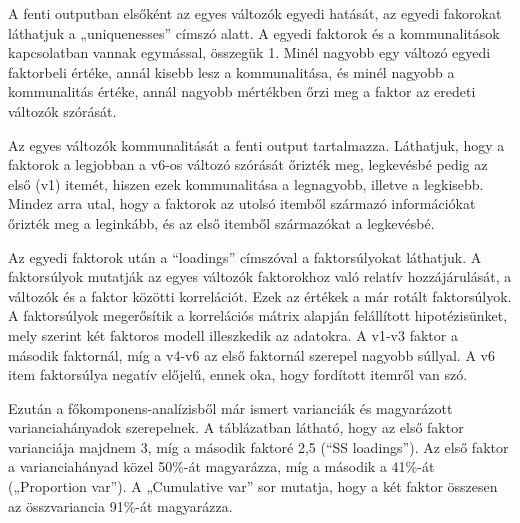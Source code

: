 \documentclass[
  letterpaper,
]{krantz}
\makeatletter
\newenvironment{Shaded}{\begin{snugshade}}{\end{snugshade}}
\newcommand{\AttributeTok}[1]{\textcolor[rgb]{0.40,0.45,0.13}{#1}}
\newcommand{\CommentTok}[1]{\textcolor[rgb]{0.37,0.37,0.37}{#1}}
\newcommand{\DecValTok}[1]{\textcolor[rgb]{0.68,0.00,0.00}{#1}}
\newcommand{\FunctionTok}[1]{\textcolor[rgb]{0.28,0.35,0.67}{#1}}
\newcommand{\NormalTok}[1]{\textcolor[rgb]{0.00,0.23,0.31}{#1}}
\newcommand{\OtherTok}[1]{\textcolor[rgb]{0.00,0.23,0.31}{#1}}
\newcommand{\SpecialCharTok}[1]{\textcolor[rgb]{0.37,0.37,0.37}{#1}}
\newenvironment{kframe}{%
\medskip{}
\setlength{\fboxsep}{.8em}
 \def\at@end@of@kframe{}%
 \ifinner\ifhmode%
  \def\at@end@of@kframe{\end{minipage}}%
  \begin{minipage}{\columnwidth}%
 \fi\fi%
 \def\FrameCommand##1{\hskip\@totalleftmargin \hskip-\fboxsep
 \colorbox{shadecolor}{##1}\hskip-\fboxsep
     \hskip-\linewidth \hskip-\@totalleftmargin \hskip\columnwidth}%
 \MakeFramed {\advance\hsize-\width
   \@totalleftmargin\z@ \linewidth\hsize
   \@setminipage}}%
 {\par\unskip\endMakeFramed%
 \at@end@of@kframe}
\renewenvironment{Shaded}{\begin{kframe}}{\end{kframe}}
\makeatother
\begin{document}
A fenti outputban elsőként az egyes változók egyedi hatását, az egyedi
fakorokat láthatjuk a „uniquenesses'' címszó alatt. A egyedi faktorok és
a kommunalitások kapcsolatban vannak egymással, összegük 1. Minél
nagyobb egy változó egyedi faktorbeli értéke, annál kisebb lesz a
kommunalitása, és minél nagyobb a kommunalitás értéke, annál nagyobb
mértékben őrzi meg a faktor az eredeti változók szórását.

\begin{Shaded}
\end{Shaded}

Az egyes változók kommunalitását a fenti output tartalmazza. Láthatjuk,
hogy a faktorok a legjobban a v6-os változó szórását őrizték meg,
legkevésbé pedig az első (v1) itemét, hiszen ezek kommunalitása a
legnagyobb, illetve a legkisebb. Mindez arra utal, hogy a faktorok az
utolsó itemből származó információkat őrizték meg a leginkább, és az
első itemből származókat a legkevésbé.

Az egyedi faktorok után a ``loadings'' címszóval a faktorsúlyokat
láthatjuk. A faktorsúlyok mutatják az egyes változók faktorokhoz való
relatív hozzájárulását, a változók és a faktor közötti korrelációt. Ezek
az értékek a már rotált faktorsúlyok. A faktorsúlyok megerősítik a
korrelációs mátrix alapján felállított hipotézisünket, mely szerint két
faktoros modell illeszkedik az adatokra. A v1-v3 faktor a második
faktornál, míg a v4-v6 az első faktornál szerepel nagyobb súllyal. A v6
item faktorsúlya negatív előjelű, ennek oka, hogy fordított itemről van
szó.

Ezután a főkomponens-analízisből már ismert varianciák és magyarázott
varianciahányadok szerepelnek. A táblázatban látható, hogy az első
faktor varianciája majdnem 3, míg a második faktoré 2,5 (``SS
loadings''). Az első faktor a varianciahányad közel 50\%-át magyarázza,
míg a második a 41\%-át („Proportion var''). A „Cumulative var'' sor
mutatja, hogy a két faktor összesen az összvariancia 91\%-át magyarázza.
\end{document}
